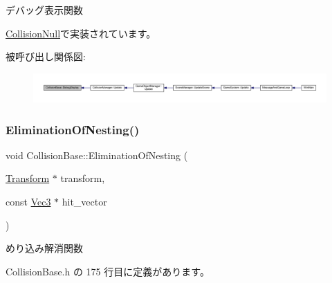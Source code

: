 デバッグ表示関数 



\mbox{\hyperlink{class_collision_null_a3ee0dacfb13c949538519f39d2f6fb0f}{Collision\+Null}}で実装されています。

被呼び出し関係図\+:
\nopagebreak
\begin{figure}[H]
\begin{center}
\leavevmode
\includegraphics[width=350pt]{class_collision_base_a0b2c1e3b090431d596b6a17e81360932_icgraph}
\end{center}
\end{figure}
\mbox{\label{class_collision_base_a257660ba9ad63f8c92137fdd24ad46cb}} 
\subsubsection{\texorpdfstring{Elimination\+Of\+Nesting()}{EliminationOfNesting()}}
{\footnotesize\ttfamily void Collision\+Base\+::\+Elimination\+Of\+Nesting (\begin{DoxyParamCaption}\item[{\mbox{\hyperlink{class_transform}{Transform}} $\ast$}]{transform,  }\item[{const \mbox{\hyperlink{_vector3_d_8h_ab16f59e4393f29a01ec8b9bbbabbe65d}{Vec3}} $\ast$}]{hit\+\_\+vector }\end{DoxyParamCaption})\hspace{0.3cm}{\ttfamily [inline]}}



めり込み解消関数 



 Collision\+Base.\+h の 175 行目に定義があります。

